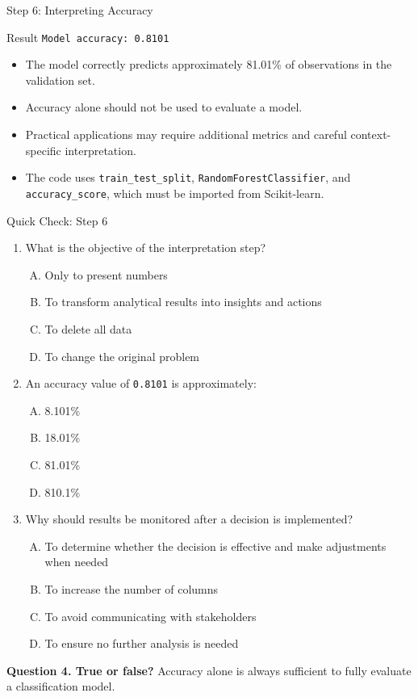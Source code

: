 \documentclass[aspectratio=169,11pt]{beamer}
\newcommand{\quiztitle}[1]{\textbf{\textcolor{QuizOrange}{#1}}}
\begin{document}
\begin{frame}{Step 6: Interpreting Accuracy}
\begin{block}{Result}
\texttt{Model accuracy: 0.8101}
\end{block}
\begin{itemize}
  \item The model correctly predicts approximately 81.01\% of observations in the validation set.
  \item Accuracy alone should not be used to evaluate a model.
  \item Practical applications may require additional metrics and careful context-specific interpretation.
  \item The code uses \texttt{train\_test\_split}, \texttt{RandomForestClassifier}, and \texttt{accuracy\_score}, which must be imported from Scikit-learn.
\end{itemize}
\end{frame}

\begin{frame}{Quick Check: Step 6}
\begin{enumerate}\small
  \item What is the objective of the interpretation step?
  \begin{enumerate}[A.]\small
    \item Only to present numbers
    \item To transform analytical results into insights and actions
    \item To delete all data
    \item To change the original problem
  \end{enumerate}
  \item An accuracy value of \texttt{0.8101} is approximately:
  \begin{enumerate}[A.]\small
    \item 8.101\% \item 18.01\% \item 81.01\% \item 810.1\%
  \end{enumerate}
  \item Why should results be monitored after a decision is implemented?
  \begin{enumerate}[A.]\small
    \item To determine whether the decision is effective and make adjustments when needed
    \item To increase the number of columns
    \item To avoid communicating with stakeholders
    \item To ensure no further analysis is needed
  \end{enumerate}
\end{enumerate}
\quiztitle{Question 4. True or false?} Accuracy alone is always sufficient to fully evaluate a classification model.
\end{frame}
\end{document}

